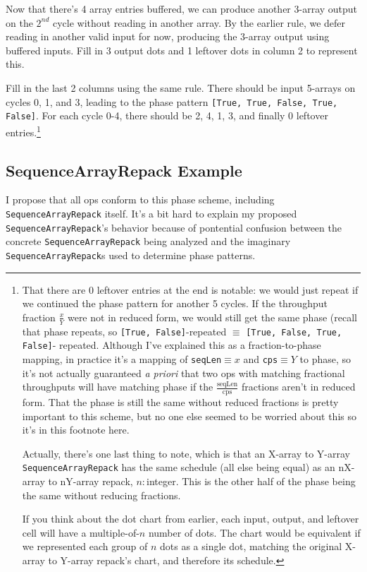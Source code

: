 \documentclass[12pt]{article}
\begin{document}
Now that there's 4 array entries buffered, we can produce another
3-array output on the $2^{nd}$ cycle without reading in another array.
By the earlier rule, we defer reading in another valid input for now,
producing the 3-array output using buffered inputs. Fill in 3 output
dots and 1 leftover dots in column 2 to represent this.

Fill in the last 2 columns using the same rule. There should be
input 5-arrays on cycles 0, 1, and 3, leading to the phase pattern
\texttt{[True, True, False, True, False]}. For each cycle 0-4, there
should be 2, 4, 1, 3, and finally 0 leftover entries.\footnote{
That there are 0 leftover entries at the end is notable: we would
just repeat if we continued the phase pattern for another 5 cycles.
If the throughput fraction $\frac{x}{Y}$ were not in reduced form, we
would still get the same phase (recall that phase repeats, so
\texttt{[True, False]}-repeated $\equiv$ \texttt{[True, False, True, False]}-%
repeated. Although I've explained this as a fraction-to-phase mapping,
in practice it's a mapping of \texttt{seqLen}$\equiv x$ and
\texttt{cps}$\equiv Y$ to phase, so it's not actually guaranteed
\textit{a priori} that two ops with matching fractional throughputs
will have matching phase if the $\frac{\text{seqLen}}{\text{cps}}$
fractions aren't in reduced form. That the phase is still the same
without reduced fractions is pretty important to this scheme, but
no one else seemed to be worried about this so it's in this footnote
here.

Actually, there's one last thing to note, which is that an
X-array to Y-array \texttt{SequenceArrayRepack} has the same schedule
(all else being equal) as an nX-array to nY-array repack, $n:$integer.
This is the other half of the phase being the same without reducing
fractions.

If you think about the dot chart from earlier, each input, output,
and leftover cell will have a multiple-of-$n$ number of dots. The
chart would be equivalent if we represented each group of $n$ dots
as a single dot, matching the original X-array to Y-array repack's chart,
and therefore its schedule.}

\subsection{SequenceArrayRepack Example}

I propose that all ops conform to this phase scheme, including
\texttt{SequenceArrayRepack} itself. It's a bit hard to explain my
proposed \texttt{SequenceArrayRepack}'s behavior because of pontential
confusion between the concrete \texttt{SequenceArrayRepack} being
analyzed and the imaginary \texttt{SequenceArrayRepack}s used to
determine phase patterns.
\end{document}
